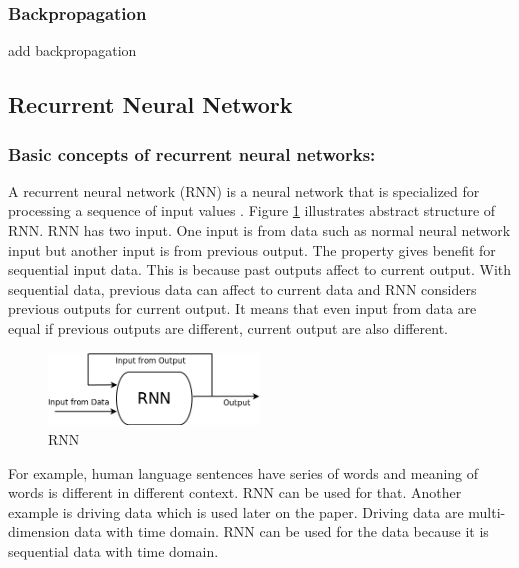 \documentclass[draft,dvipsnames]{drexel-thesis}
\begin{document}
\begin{thesis}
\subsubsection{Backpropagation}\label{subsubsec:BP}
{\color{blue} add backpropagation}




\subsection{Recurrent Neural Network}\label{subsec:RNN}

\subsubsection{Basic concepts of recurrent neural networks:}\label{basicRNN}
	A recurrent neural network (RNN) is a neural network that is specialized for processing a sequence of input values \cite{Goodfellow-et-al-2016}. Figure \ref{fig:RNN} illustrates abstract structure of RNN. RNN has two input. One input is from data such as normal neural network input but another input is from previous output. The property gives benefit for sequential input data. This is because past outputs affect to current output. With sequential data, previous data can affect to current data and RNN considers previous outputs for current output. It means that even input from data are equal if previous outputs are different, current output are also different.

\begin{figure}[t!]
    \centering
    \includegraphics[width=0.5\textwidth]{pictures/figures/RNN.png}
    \caption{RNN}
    \label{fig:RNN}
\end{figure}
	
	For example, human language sentences have series of words and meaning of words is different in different context. RNN can be used for that. Another example is driving data which is used later on the paper.  Driving data are multi-dimension data with time domain. RNN can be used for the data because it is sequential data with time domain.
	

\end{thesis}
\end{document}
